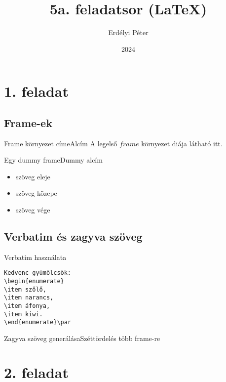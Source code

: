 \documentclass[aspectratio=169,12pt,xcolor={table}]{beamer}
\title{5a. feladatsor (LaTeX)}
\author{Erdélyi Péter}
\institute{Miskolci Egyetem}
\date{2024}
\begin{document}
\frame{\titlepage}
\section{1. feladat}
\subsection{Frame-ek}
\begin{frame}{Frame környezet címe}{Alcím}
\transblindshorizontal
A legelső $frame$ környezet diája látható itt.
\end{frame}
\begin{frame}{Egy dummy frame}{Dummy alcím}
\begin{itemize}
\item<1,3-4> szöveg eleje
\item<2,4> szöveg közepe
\item<1-2> szöveg vége
\end{itemize}
\end{frame}
\subsection{Verbatim és zagyva szöveg}
\begin{frame}[fragile]{Verbatim használata}
\transblindshorizontal
\begin{verbatim}
Kedvenc gyümölcsök:
\begin{enumerate}
\item szőlő,
\item narancs,
\item áfonya,
\item kiwi.
\end{enumerate}\par
\end{verbatim}
\end{frame}
\begin{frame}[allowframebreaks]{Zagyva szöveg generálása}{Széttördelés több frame-re}
\hulipsum[3]
\end{frame}
\section{2. feladat}
\end{document}
